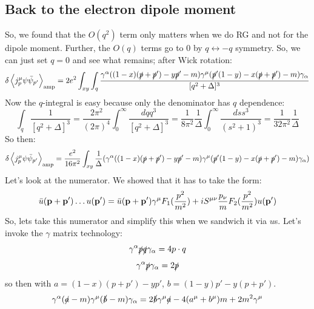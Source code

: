 \subsection{Back to the electron dipole moment}
So, we found that the $O(q^2)$ term only matters when we do RG and not for the dipole moment. Further, the $O(q)$ terms go to 0 by $q \leftrightarrow -q$ symmetry. So, we can just set $q = 0$ and see what remains; after Wick rotation:
\begin{equation}
    \delta \left< j^\mu_p \psi \bar{\psi}_{p'} \right>_{\text{amp}} = 2e^2\int_{xy}\int_q \frac{\gamma^\alpha((1-x)(\slashed{p} + \slashed{p}') - y\slashed{p}' - m)\gamma^\mu(\slashed{p}'(1-y) - x(\slashed{p} + \slashed{p}') - m)\gamma_\alpha}{[q^2 + \Delta]^3}
\end{equation}
Now the $q$-integral is easy because only the denominator has $q$ dependence:
\begin{equation}
    \int_q \frac{1}{[q^2 + \Delta]^3} = \frac{2\pi^2}{(2\pi)^4}\int_0^\infty \frac{dq q^3}{[q^2 + \Delta]^3} = \frac{1}{8\pi^2}\frac{1}{\Delta}\int_0^\infty \frac{ds s^3}{(s^2 + 1)^3} = \frac{1}{32\pi^2}\frac{1}{\Delta}
\end{equation}
So then:
\begin{equation}
    \delta \left< j^\mu_p \psi \bar{\psi}_{p'} \right>_{\text{amp}} = \frac{e^2}{16\pi^2}\int_{xy}\frac{1}{\Delta}(\gamma^\alpha((1-x)(\slashed{p} + \slashed{p}') - y\slashed{p}' - m)\gamma^\mu(\slashed{p}'(1-y) - x(\slashed{p} + \slashed{p}') - m)\gamma_\alpha)
\end{equation}
Let's look at the numerator. We showed that it has to take the form:
\begin{equation}
    \bar{u}(\mathbf{p}+ \mathbf{p}') \ldots u(\mathbf{p}') =  \bar{u}(\mathbf{p}+ \mathbf{p}')\gamma^\mu F_1(\frac{p^2}{m^2}) + iS^{\mu\nu}\frac{p_\nu}{m}F_2(\frac{p^2}{m^2})u(\mathbf{p}')
\end{equation}
So, lets take this numerator and simplify this when we sandwich it via $u$s. Let's invoke the $\gamma$ matrix technology:
\begin{equation}
    \gamma^\alpha \slashed{p}\slashed{q}\gamma_\alpha = 4p\cdot q
\end{equation}
\begin{equation}
    \gamma^\alpha \slashed{p}\gamma_\alpha = 2\slashed{p}
\end{equation}
so then with $a = (1-x)(p + p') - yp'$, $b = (1-y)p' - y(p + p')$.
\begin{equation}\label{eq:lec10temp}
    \gamma^\alpha (\slashed{a} - m)\gamma^\mu (\slashed{b} - m)\gamma_\alpha = 2\slashed{b}\gamma^\mu \slashed{a} - 4(a^\mu + b^\mu)m + 2m^2\gamma^\mu
\end{equation}
